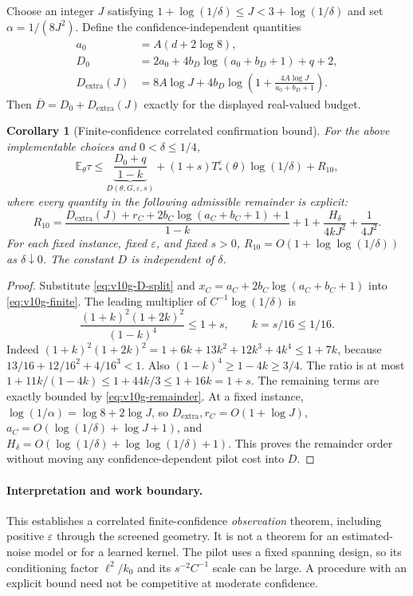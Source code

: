 \documentclass{article}
\theoremstyle{plain}
\newtheorem{corollary}[theorem]{Corollary}
\theoremstyle{definition}
\begin{document}
Choose an integer $J$ satisfying
$1+\log(1/\delta)\le J<3+\log(1/\delta)$ and set
$\alpha=1/(8J^2)$.  Define the confidence-independent quantities
\begin{align}
 a_0&=A(d+2\log8),\nonumber\\
 D_0&=2a_0+4b_D\log(a_0+b_D+1)+q+2,\nonumber\\
 D_\mathrm{extra}(J)
 &=8A\log J+
       4b_D\log\left(1+\frac{4A\log J}{a_0+b_D+1}\right).
 \label{eq:v10g-D-split}
\end{align}
Then $\overline D=D_0+D_\mathrm{extra}(J)$ exactly for the
displayed real-valued budget.

\begin{corollary}[Finite-confidence correlated confirmation bound]
\label{cor:v10g-target}\label{thm:bay-finite-detailed}
For the above implementable choices and $0<\delta\le1/4$,
\begin{equation}
 \mathbb E_\theta\tau\le
 \underbrace{\frac{D_0+q}{1-k}}_{D(\theta,G,\varepsilon,s)}
 +(1+s)T_*^\varepsilon(\theta)\log(1/\delta)+R_{10},
 \label{eq:v10g-target}
\end{equation}
where every quantity in the following admissible remainder is explicit:
\begin{equation}
 R_{10}=
 \frac{D_\mathrm{extra}(J)+r_C+
             2b_C\log(a_C+b_C+1)+1}{1-k}
 +1+\frac{H_\delta}{4kJ^2}+\frac1{4J^2}.
 \label{eq:v10g-remainder}
\end{equation}
For each fixed instance, fixed $\varepsilon$, and fixed $s>0$,
$R_{10}=O(1+\log\log(1/\delta))$ as $\delta\downarrow0$.
The constant $D$ is independent of $\delta$.
\end{corollary}
\begin{proof}
Substitute \eqref{eq:v10g-D-split} and
$x_C=a_C+2b_C\log(a_C+b_C+1)$ into
\eqref{eq:v10g-finite}.  The leading multiplier of
$C^{-1}\log(1/\delta)$ is
\[
 \frac{(1+k)^2(1+2k)^2}{(1-k)^4}\le1+s,
 \qquad k=s/16\le1/16.
\]
Indeed $(1+k)^2(1+2k)^2=1+6k+13k^2+12k^3+4k^4\le1+7k$,
because $13/16+12/16^2+4/16^3<1$.
Also $(1-k)^4\ge1-4k\ge3/4$.  The ratio is at most
$1+11k/(1-4k)\le1+44k/3\le1+16k=1+s$.
The remaining terms are exactly bounded by
\eqref{eq:v10g-remainder}.  At a fixed instance,
$\log(1/\alpha)=\log8+2\log J$, so
$D_\mathrm{extra},r_C=O(1+\log J)$,
$a_C=O(\log(1/\delta)+\log J+1)$, and
$H_\delta=O(\log(1/\delta)+\log\log(1/\delta)+1)$.
This proves the remainder order without moving any confidence-dependent
pilot cost into $D$.
\end{proof}

\paragraph{Interpretation and work boundary.}
This establishes a correlated finite-confidence
\emph{observation} theorem, including positive $\varepsilon$ through the
screened geometry.  It is not a theorem for an estimated-noise model or for a learned kernel.  The pilot uses a fixed spanning design, so
its conditioning factor $\ell^2/k_0$ and its $s^{-2}C^{-1}$ scale can be
large.  A procedure with an explicit bound need not be competitive at moderate confidence.
\end{document}
